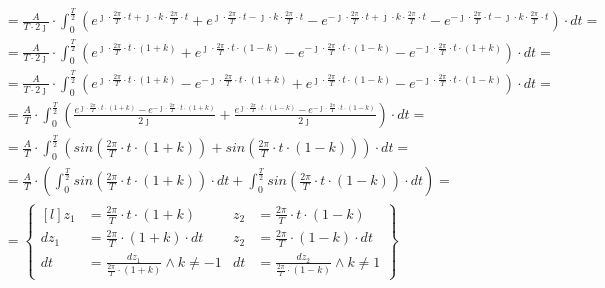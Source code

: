 \begin{task}
\begin{align*}
&=\frac{A}{T\cdot 2\jmath} \cdot \int_{0}^{\frac{T}{2}}
\left(e^{\jmath \cdot \frac{2\pi}{T} \cdot t + \jmath \cdot k \cdot \frac{2\pi}{T} \cdot t} + e^{\jmath \cdot \frac{2\pi}{T} \cdot t -\jmath \cdot k \cdot \frac{2\pi}{T} \cdot t} - e^{-\jmath \cdot \frac{2\pi}{T} \cdot t+ \jmath \cdot k \cdot \frac{2\pi}{T} \cdot t} - e^{-\jmath \cdot \frac{2\pi}{T} \cdot t -\jmath \cdot k \cdot \frac{2\pi}{T} \cdot t} \right) \cdot dt=\\
&=\frac{A}{T\cdot 2\jmath} \cdot \int_{0}^{\frac{T}{2}}
\left(e^{\jmath \cdot \frac{2\pi}{T} \cdot t \cdot \left(1+k\right)} + e^{\jmath \cdot \frac{2\pi}{T} \cdot t \cdot \left(1 - k\right)} - e^{-\jmath \cdot \frac{2\pi}{T} \cdot t \cdot \left(1 -k\right)} - e^{-\jmath \cdot \frac{2\pi}{T} \cdot t \cdot \left(1+k\right)} \right) \cdot dt=\\
&=\frac{A}{T\cdot 2\jmath} \cdot \int_{0}^{\frac{T}{2}}
\left(e^{\jmath \cdot \frac{2\pi}{T} \cdot t \cdot \left(1+k\right)} - e^{-\jmath \cdot \frac{2\pi}{T} \cdot t \cdot \left(1+k\right)} + e^{\jmath \cdot \frac{2\pi}{T} \cdot t \cdot \left(1 - k\right)} - e^{-\jmath \cdot \frac{2\pi}{T} \cdot t \cdot \left(1 -k\right)} \right) \cdot dt=\\
&=\frac{A}{T} \cdot \int_{0}^{\frac{T}{2}}
\left( \frac{e^{\jmath \cdot \frac{2\pi}{T} \cdot t \cdot \left(1+k\right)} - e^{-\jmath \cdot \frac{2\pi}{T} \cdot t \cdot \left(1+k\right)}}{2\jmath} + \frac{e^{\jmath \cdot \frac{2\pi}{T} \cdot t \cdot \left(1 - k\right)} - e^{-\jmath \cdot \frac{2\pi}{T} \cdot t \cdot \left(1 -k\right)}}{2\jmath} \right) \cdot dt=\\
&=\frac{A}{T} \cdot \int_{0}^{\frac{T}{2}}
\left( sin\left( \frac{2\pi}{T} \cdot t \cdot \left(1+k\right) \right) + sin\left( \frac{2\pi}{T} \cdot t \cdot \left(1 - k\right)\right) \right) \cdot dt=\\
&=\frac{A}{T} \cdot \left( \int_{0}^{\frac{T}{2}}
 sin\left( \frac{2\pi}{T} \cdot t \cdot \left(1+k\right) \right) \cdot dt + \int_{0}^{\frac{T}{2}} sin\left( \frac{2\pi}{T} \cdot t \cdot \left(1 - k\right)\right) \cdot dt \right)=\\
&=\begin{Bmatrix*}[l]
z_1&=\frac{2\pi}{T} \cdot t \cdot \left(1+k\right) & z_2&=\frac{2\pi}{T} \cdot t \cdot \left(1-k\right)\\
dz_1&=\frac{2\pi}{T} \cdot \left(1+k\right) \cdot dt & z_2&=\frac{2\pi}{T} \cdot \left(1-k\right) \cdot dt\\
dt&=\frac{dz_1}{\frac{2\pi}{T} \cdot \left(1+k\right)} \wedge k \neq -1& dt&=\frac{dz_2}{\frac{2\pi}{T} \cdot \left(1-k\right)} \wedge k \neq 1

\end{Bmatrix*}
\end{align*}
\end{task}
